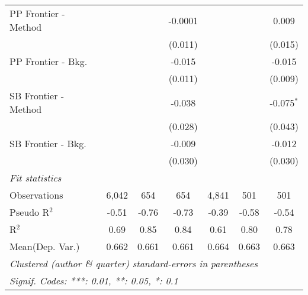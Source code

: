 \begin{tabular}{lcccccc}
   PP Frontier - Method &         &              & -0.0001 &         &               & 0.009\\   
                        &         &              & (0.011) &         &               & (0.015)\\   
   PP Frontier - Bkg.   &         &              & -0.015  &         &               & -0.015\\   
                        &         &              & (0.011) &         &               & (0.009)\\   
   SB Frontier - Method &         &              & -0.038  &         &               & -0.075$^{*}$\\   
                        &         &              & (0.028) &         &               & (0.043)\\   
   SB Frontier - Bkg.   &         &              & -0.009  &         &               & -0.012\\   
                        &         &              & (0.030) &         &               & (0.030)\\   
   \midrule
   \emph{Fit statistics}\\
   Observations         & 6,042   & 654          & 654     & 4,841   & 501           & 501\\  
   Pseudo R$^2$         & -0.51   & -0.76        & -0.73   & -0.39   & -0.58         & -0.54\\  
   R$^2$                & 0.69    & 0.85         & 0.84    & 0.61    & 0.80          & 0.78\\  
Mean(Dep. Var.) & 0.662 & 0.661 & 0.661 & 0.664 & 0.663 & 0.663 \\
   \midrule \midrule
   \multicolumn{7}{l}{\emph{Clustered (author \& quarter) standard-errors in parentheses}}\\
   \multicolumn{7}{l}{\emph{Signif. Codes: ***: 0.01, **: 0.05, *: 0.1}}\\
\end{tabular}
\par\endgroup
